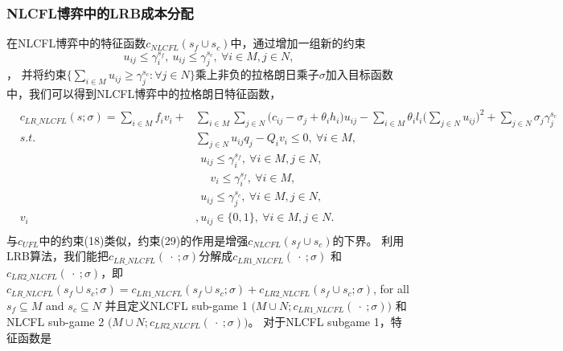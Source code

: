 \documentclass[UTF8]{article}
\begin{document}
\begin{定义}
      \subsubsection{NLCFL博弈中的LRB成本分配}\label{example-decompnlcfl}
      在NLCFL博弈中的特征函数$c_{NLCFL}(s_f \cup s_c)$中，通过增加一组新的约束
      \begin{equation}\label{eqn:CFLLRBR}
      u_{ij} \leq \gamma_i^{s_f}, ~u_{ij} \leq \gamma_j^{s_c},~\forall i \in M, j \in N,
      \end{equation}，
      并将约束$\big\{\sum_{i \in M} u_{ij} \geq \gamma_j^{s_c}:\forall j \in N\big\}$乘上非负的拉格朗日乘子$\sigma$加入目标函数中，我们可以得到NLCFL博弈中的拉格朗日特征函数，
      \begin{eqnarray*}\label{eqn:LRCFnonlinear}
      \begin{aligned}
      \begin{split}
      c_{LR\_NLCFL}(s;\sigma) = \sum_{i \in M}f_iv_i + &\sum_{i \in M} \sum_{j \in N} \big(c_{ij} - \sigma_{j} + \theta_ih_i\big)u_{ij}
       - \sum_{i \in M} \theta_il_i \big( \sum_{j \in N}u_{ij}\big)^2 + \sum_{j \in N} \sigma_j \gamma_j^{s_c}\\
      s.t.~&\sum_{j \in N}u_{ij}q_j - Q_iv_i \leq 0,~\forall i \in M,\\
      ~~~~~~&~~u_{ij} \leq \gamma_i^{s_f},~\forall i \in M, j \in N,\\
      ~~~&~~~~~~v_i \leq \gamma_i^{s_f},~\forall i \in M,\\
      ~~~~~~&~~u_{ij} \leq \gamma_j^{s_c},~\forall i \in M, j \in N,\\
      v_i&, u_{ij} \in \{0,1\}, ~\forall i \in M, j \in N.
      \end{split}
      \end{aligned}
      \end{eqnarray*}
      与$c_{UFL}$中的约束(18)类似，约束(29)的作用是增强$c_{NLCFL}(s_f \cup s_c)$的下界。
      利用LRB算法，我们能把$c_{LR\_NLCFL}(\ \cdot\ ;\sigma)$分解成$c_{LR1\_NLCFL}(\ \cdot\ ;\sigma)$ 和 $c_{LR2\_NLCFL}(\ \cdot\ ;\sigma)$，即$c_{LR\_NLCFL}(s_f \cup s_c;\sigma) = c_{LR1\_NLCFL}(s_f \cup s_c;\sigma) + c_{LR2\_NLCFL}(s_f \cup s_c;\sigma)$, for all $s_f \subseteq M$ and $s_c \subseteq N$
      并且定义NLCFL sub-game 1 $\big(M \cup N;c_{LR1\_NLCFL}(\ \cdot\ ;\sigma)\big)$ 和 NLCFL sub-game 2 $\big(M \cup N;c_{LR2\_NLCFL}(\ \cdot\ ;\sigma)\big)$。
      对于NLCFL subgame 1，特征函数是
      \begin{eqnarray}\label{eqn:ncgcf}
      \begin{aligned}

\end{aligned}
\end{eqnarray}
\end{定义}
\end{document}
